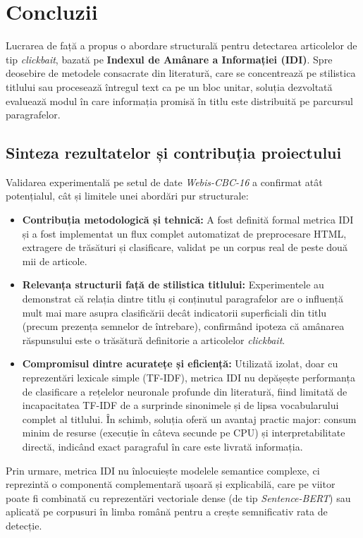 \documentclass[12pt, a4paper]{article}
\begin{document}
\section{Concluzii}

Lucrarea de față a propus o abordare structurală pentru detectarea articolelor de tip \textit{clickbait}, bazată pe \textbf{Indexul de Amânare a Informației (IDI)}. Spre deosebire de metodele consacrate din literatură, care se concentrează pe stilistica titlului sau procesează întregul text ca pe un bloc unitar, soluția dezvoltată evaluează modul în care informația promisă în titlu este distribuită pe parcursul paragrafelor.

\subsection{Sinteza rezultatelor și contribuția proiectului}

Validarea experimentală pe setul de date \textit{Webis-CBC-16} a confirmat atât potențialul, cât și limitele unei abordări pur structurale:
\begin{itemize}
    \item \textbf{Contribuția metodologică și tehnică:} A fost definită formal metrica IDI și a fost implementat un flux complet automatizat de preprocesare HTML, extragere de trăsături și clasificare, validat pe un corpus real de peste două mii de articole.
    \item \textbf{Relevanța structurii față de stilistica titlului:} Experimentele au demonstrat că relația dintre titlu și conținutul paragrafelor are o influență mult mai mare asupra clasificării decât indicatorii superficiali din titlu (precum prezența semnelor de întrebare), confirmând ipoteza că amânarea răspunsului este o trăsătură definitorie a articolelor \textit{clickbait}.
    \item \textbf{Compromisul dintre acuratețe și eficiență:} Utilizată izolat, doar cu reprezentări lexicale simple (TF-IDF), metrica IDI nu depășește performanța de clasificare a rețelelor neuronale profunde din literatură, fiind limitată de incapacitatea TF-IDF de a surprinde sinonimele și de lipsa vocabularului complet al titlului. În schimb, soluția oferă un avantaj practic major: consum minim de resurse (execuție în câteva secunde pe CPU) și interpretabilitate directă, indicând exact paragraful în care este livrată informația.
\end{itemize}

Prin urmare, metrica IDI nu înlocuiește modelele semantice complexe, ci reprezintă o componentă complementară ușoară și explicabilă, care pe viitor poate fi combinată cu reprezentări vectoriale dense (de tip \textit{Sentence-BERT}) sau aplicată pe corpusuri în limba română pentru a crește semnificativ rata de detecție.
\end{document}
